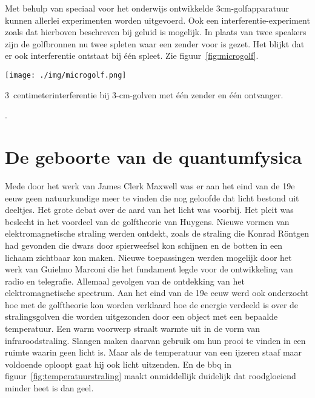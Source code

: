 {Met behulp van speciaal voor het onderwijs ontwikkelde 3cm-golfapparatuur kunnen allerlei experimenten worden uitgevoerd. Ook een interferentie-experiment zoals dat hierboven beschreven bij geluid is mogelijk. In plaats van twee speakers zijn de golfbronnen nu twee spleten waar een zender voor is gezet. 
Het blijkt dat er ook interferentie ontstaat bij \'e\'en spleet. Zie figuur~\ref{fig:microgolf}.

\begin{center}
\leavevmode
\texttt{[image: ./img/microgolf.png]}
\end{center}

\begin{experiment}{3~centimeter}interferentie bij 3-cm-golven met \'e\'en zender en \'e\'en ontvanger.
\end{experiment}
.


\section{De geboorte van de quantumfysica}
Mede door het werk van James Clerk Maxwell was er aan het eind van de 19e eeuw geen natuurkundige meer te vinden die nog geloofde dat licht bestond uit deeltjes. Het grote debat over de aard van het licht was voorbij. Het pleit was beslecht in het voordeel van de golftheorie van Huygens. Nieuwe vormen van elektromagnetische straling werden ontdekt, zoals de straling die Konrad R\"ontgen had gevonden die dwars door spierweefsel kon schijnen en de botten in een lichaam zichtbaar kon maken. Nieuwe toepassingen werden mogelijk door het werk van Guielmo Marconi die het fundament legde voor de ontwikkeling van radio en telegrafie. Allemaal gevolgen van de ontdekking van het elektromagnetische spectrum. Aan het eind van de 19e eeuw werd ook onderzocht hoe met de golftheorie kon worden verklaard hoe de energie verdeeld is over de stralingsgolven die worden uitgezonden door een object met een bepaalde temperatuur. Een warm voorwerp straalt warmte uit in de vorm van infraroodstraling. Slangen maken daarvan gebruik om hun prooi te vinden in een ruimte waarin geen licht is. Maar als de temperatuur van een ijzeren staaf maar voldoende oploopt gaat hij ook licht uitzenden. En de bbq in figuur~\ref{fig:temperatuurstraling} maakt onmiddellijk duidelijk dat roodgloeiend minder heet is dan geel.

}
